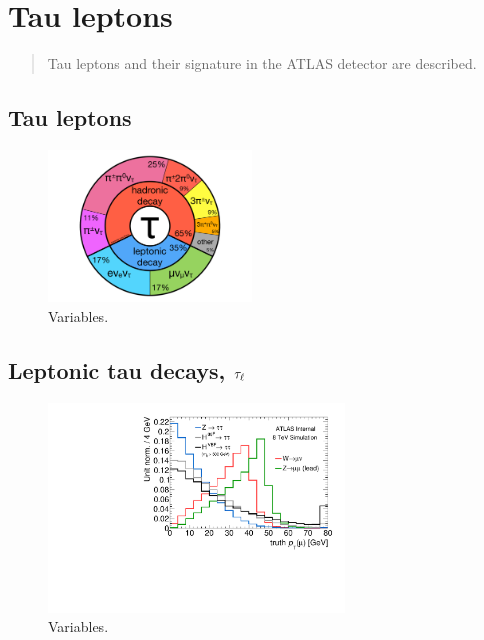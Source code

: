 \chapter[Tau leptons][Tau leptons]{Tau leptons}

\begin{quote}
  Tau leptons and their signature in the ATLAS detector are described.
\end{quote}

\section{Tau leptons}
\label{sec:taus-theory}

\begin{figure}[tp]
  \centering
  \includegraphics[width=0.48\textwidth]{figures/piecharts/taudecay}
  \caption{Variables.}
  \label{fig:taus-decaypie}
\end{figure}

\section{Leptonic tau decays, $\tau_\ell$}
\label{sec:taus-leptons}

\begin{figure}[tp]
  \centering
  \includegraphics[width=0.7\textwidth]{figures/tauperformance/leptonsfromtausaresoft}
  \caption{Variables.}
  \label{fig:taus-leptonpt}
\end{figure}


